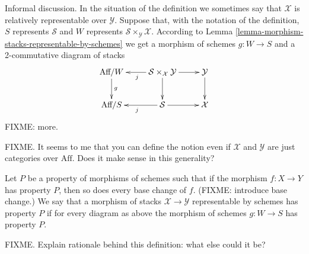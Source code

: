 \noindent
Informal discussion. In the situation of the definition we sometimes 
say that $\mathcal{X}$ is relatively representable over $\mathcal{Y}$.
Suppose that, with the notation of the definition, $S$ represents
$\mathcal{S}$ and $W$ represents $\mathcal{S}\times_\mathcal{Y}\mathcal{X}$.
According to Lemma \ref{lemma-morphism-stacks-representable-by-schemes}
we get a morphism of schemes $g : W \to S$ and a 2-commutative diagram
of stacks
$$
\xymatrix{
\text{Aff}/W \ar[d]^g &
\mathcal{S}\times_\mathcal{X}\mathcal{Y} \ar[d] \ar[l]^j \ar[r] &
\mathcal{Y} \ar[d] \\
\text{Aff}/S &
\mathcal{S} \ar[l]^j \ar[r] & \mathcal{X}
}
$$
FIXME: more.

\smallskip\noindent
FIXME. It seems to me that you can define the notion even if 
$\mathcal{X}$ and $\mathcal{Y}$ are just categories over $\text{Aff}$. Does
it make sense in this generality?

\begin{definition}
\label{definition-property-morphism-representable-by-schemes}
Let $P$ be a property of morphisms of schemes such that
if the morphism $f : X \to Y$ has property $P$, then so does
every base change of $f$. (FIXME: introduce base change.)
We say that a morphism of stacks $\mathcal{X}
\to \mathcal{Y}$ representable by schemes has property
$P$ if for every diagram as above the morphism of schemes
$g : W \to S$ has property $P$.
\end{definition}

\noindent
FIXME. Explain rationale behind this definition: what else could it be?







